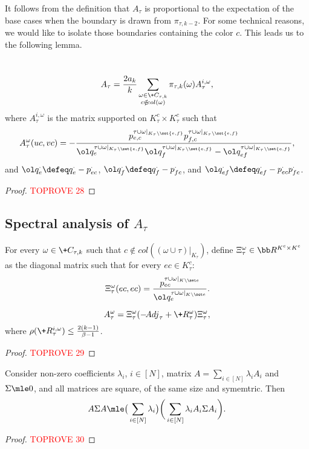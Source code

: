 \documentclass[a4paper,11pt]{article}
\begin{document}
It follows from the definition that $A_\tau$ is proportional to the expectation of the base cases when the boundary is drawn from $\pi_{\tau,k-2}$. For some technical reasons, we would like to isolate those boundaries containing the color $c$. This leads us to the following lemma.

\begin{lemma}~\label{lem:A-tau-i}
    \newcommand{\taur}{\tau\cup\omega|_{K_\tau\setminus\set{e, f}}}
	\[
		A_\tau = \frac{2a_k}{k}\sum_{\substack{\omega\in \+C_{\tau,k}\\ c\notin\!{col}(\omega)}}\pi_{\tau,k}(\omega)A^{i,\omega}_\tau,
	\]
	where $A^{i,\omega}_\tau$ is the matrix supported on $K_\tau^c\times K_\tau^c$ such that
	\[
		A_\tau^{\omega}(uc,vc) = -\frac{p^{\taur}_{e, c}p^{\taur}_{f, c}}{\ol q^{\taur}_{e}\ol q^{\taur}_{f} - \ol q^{\taur}_{ef}}, 
	\]
	and $\ol q^{\cdot}_{e}\defeq q^\cdot_{e} - p^\cdot_{ec}$,
    $\ol q^{\cdot}_{f}\defeq q^\cdot_{f} - p^\cdot_{fc}$, and
    $\ol q^{\cdot}_{ef}\defeq q^\cdot_{ef} - p^\cdot_{ec}p^\cdot_{fc}$.
\end{lemma}

\begin{proof}\textcolor{red}{TOPROVE 28}\end{proof}

\subsection{Spectral analysis of $A_\tau$}



For every $\omega\in\+C_{\tau,k}$ such that $c\not\in \!{col}((\omega\cup\tau)|_{K_\tau})$,
define $\Xi_\tau^{\omega} \in \bb R^{K^c\times K^c}$ as the diagonal matrix such that for every $ec \in K_\tau^{c}$:
\[
	\Xi_\tau^{\omega}(ec,ec) =
    \frac{p^{\tau\cup\omega|_{K\setminus \set e}}_{ec}}
         {\ol q^{\tau\cup\omega|_{K\setminus \set e}}_e}.
\]
\begin{lemma}\label{lem:A-tau-i-omega}
	\[
	A_\tau^{\omega} = \Xi_\tau^{\omega} (-\!{Adj}_\tau + \+R_\tau^{\omega}) \Xi_{\tau}^{\omega} ,
	\]
	where $\rho(\+R_\tau^{i,\omega}) \le  \frac{2(k-1)}{\beta - 1}$.
\end{lemma}
\begin{proof}\textcolor{red}{TOPROVE 29}\end{proof}

\begin{proposition}\label{prop:matrix-sq-coeff}
    Consider non-zero coefficients $\lambda_i$, $i\in [N]$, matrix $A = \sum_{i\in [N]}\lambda_i A_i$ and 
    $\Sigma\mle 0$, and all matrices are square, of the same size and symemtric. Then
    \[
    A\Sigma A \mle
    \big(\sum_{i\in [N]} \lambda_i\big)
    \bigg( \sum_{i\in [N]}\lambda_i A_i\Sigma A_i \bigg).
    \]
\end{proposition}
\begin{proof}\textcolor{red}{TOPROVE 30}\end{proof}
\end{document}
